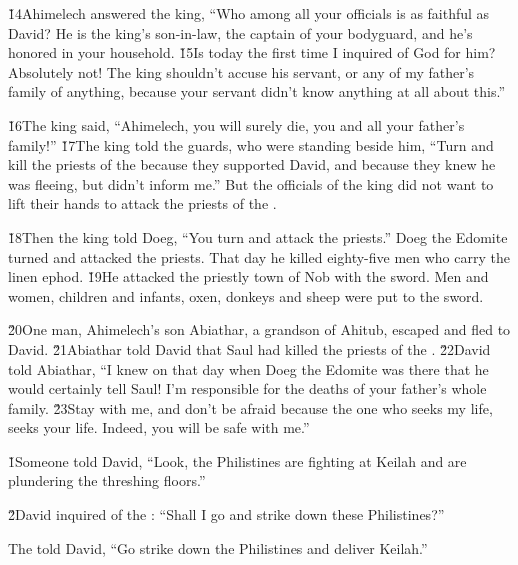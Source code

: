 \v{14}Ahimelech answered the king, ``Who among all your officials is as faithful as David? He is the king's son-in-law, the captain of your bodyguard, and he's honored in your household. \v{15}Is today the first time I inquired of God for him? Absolutely not! The king shouldn't accuse his servant, or any of my father's family of anything, because your servant didn't know anything at all about this.''

\v{16}The king said, ``Ahimelech, you will surely die, you and all your father's family!'' \v{17}The king told the guards, who were standing beside him, ``Turn and kill the priests of the  because they supported David, and because they knew he was fleeing, but didn't inform me.'' But the officials of the king did not want to lift their hands to attack the priests of the .

\v{18}Then the king told Doeg, ``You turn and attack the priests.'' Doeg the Edomite turned and attacked the priests. That day he killed eighty-five men who carry the linen ephod. \v{19}He attacked the priestly town of Nob with the sword. Men and women, children and infants, oxen, donkeys and sheep were put to the sword.

\v{20}One man, Ahimelech's son Abiathar, a grandson of Ahitub, escaped and fled to David. \v{21}Abiathar told David that Saul had killed the priests of the . \v{22}David told Abiathar, ``I knew on that day when Doeg the Edomite was there that he would certainly tell Saul! I'm responsible for the deaths of your father's whole family. \v{23}Stay with me, and don't be afraid because the one who seeks my life, seeks your life. Indeed, you will be safe with me.''

\v{1}Someone told David, ``Look, the Philistines are fighting at Keilah and are plundering the threshing floors.''

\v{2}David inquired of the : ``Shall I go and strike down these Philistines?''

The  told David, ``Go strike down the Philistines and deliver Keilah.''

